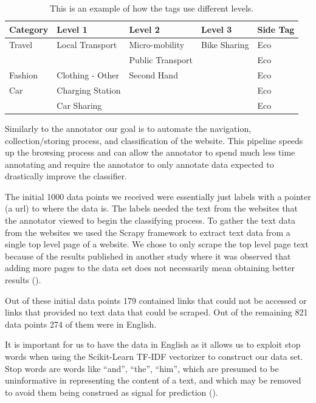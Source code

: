 \begin{table}[h]
\begin{tabular}{|l|l|l|l|l|}
\hline
Category       & Level 1                     & Level 2                       & Level 3      & Side Tag \\ \hline
Travel         & Local Transport             & Micro-mobility                & Bike Sharing & Eco      \\ \hline
               &                             & Public Transport              &              & Eco      \\ \hline
Fashion        & Clothing - Other            & Second Hand                   &              & Eco      \\ \hline
Car            & Charging Station            &                               &              & Eco      \\ \hline
               & Car Sharing                 &                               &              & Eco      \\ \hline
\end{tabular}
\caption{This is an example of how the tags use different levels.}
\label{tab:tags}
\end{table}


Similarly to the annotator our goal is to automate the navigation, collection/storing process, and classification of the website. This pipeline speeds up the browsing process and can allow the annotator to spend much less time annotating and require the annotator to only annotate data expected to drastically improve the classifier.

The initial 1000 data points we received were essentially just labels with a pointer (a url) to where the data is. The labels needed the text from the websites that the annotator viewed to begin the classifying process. To gather the text data from the websites we used the Scrapy framework to extract text data from a single top level page of a website. We chose to only scrape the top level page text because
of the results published in another study where it was observed that adding more pages to the data set does not necessarily mean obtaining better results (\cite{sahid2019ecommerce}). 

Out of these initial data points 179 contained links that could not be accessed or links that provided no text data that could be scraped. Out of the remaining 821 data points 274 of them were in English. 

It is important for us to have the data in English as it allows us to exploit stop words when using the Scikit-Learn TF-IDF vectorizer to construct our data set. Stop words are words like “and”, “the”, “him”, which are presumed to be uninformative in representing the content of a text, and which may be removed to avoid them being construed as signal for prediction (\cite{sklearn62feature}).

